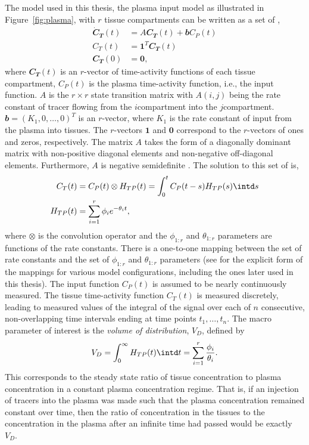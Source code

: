 The model used in this thesis, the plasma input model as illustrated in Figure~\ref{fig:plasma}, with $r$ tissue compartments can be written as a set of \ode,
\begin{align*}
  \dot{\mathbfit{C}}_{\mathbfit{T}}(t)
  & = A\mathbfit{C}_{\mathbfit{T}}(t) + \mathbfit{b} C_P(t)\\
  C_T(t)
  & = \mathbf{1}^T\mathbfit{C}_{\mathbfit{T}}(t) \\
  \mathbfit{C}_{\mathbfit{T}}(0) & = \mathbf{0},
\end{align*}
where $\mathbfit{C}_{\mathbfit{T}}(t)$ is an $r$-vector of time-activity functions of each tissue compartment, $C_P(t)$ is the plasma time-activity function, i.e., the input function. $A$ is the $r \times r$ state transition matrix with $A(i,j)$ being the rate constant of tracer flowing from the $i$\xth compartment into the $j$\xth compartment. $\mathbfit{b} = (K_1, 0, \dots, 0)^T$ is an $r$-vector, where $K_1$ is the rate constant of input from the plasma into tissues. The $r$-vectors $\mathbf{1}$ and $\mathbf{0}$ correspond to the $r$-vectors of ones and zeros, respectively. The matrix $A$ takes the form of a diagonally dominant matrix with non-positive diagonal elements and non-negative off-diagonal elements. Furthermore, $A$ is negative semidefinite \cite{Gunn:2001cx}. The solution to this set of \ode is,
\begin{align}
  C_T(t) & = C_P(t) \otimes H_{TP}(t) = \int_0^t C_P(t-s) H_{TP}(s)\intd s
  \label{eq:CT} \\
  H_{TP}(t) & = \sum_{i=1}^r \phi_i e^{-\theta_i t},
  \label{eq:HTP}
\end{align}
where $\otimes$ is the convolution operator and the $\phi_{1:r}$ and $\theta_{1:r}$ parameters are functions of the rate constants. There is a one-to-one mapping between the set of rate constants and the set of $\phi_{1:r}$ and $\theta_{1:r}$ parameters (see \cite{Gunn:2001cx} for the explicit form of the mappings for various model configurations, including the ones later used in this thesis). The input function $C_P(t)$ is assumed to be nearly continuously measured. The tissue time-activity function $C_T(t)$ is measured discretely, leading to measured values of the integral of the signal over each of $n$ consecutive, non-overlapping time intervals ending at time points $t_1, \dots, t_n$. The macro parameter of interest is the \emph{volume of distribution}, $V_D$, defined by
\begin{equation}
  V_D = \int_0^{\infty} H_{TP}(t) \intd t = \sum_{i=1}^r
  \frac{\phi_i}{\theta_i}.
\end{equation}
This corresponds to the steady state ratio of tissue concentration to plasma concentration in a constant plasma concentration regime. That is, if an injection of tracers into the plasma was made such that the plasma concentration remained constant over time, then the ratio of concentration in the tissues to the concentration in the plasma after an infinite time had passed would be exactly $V_D$.

